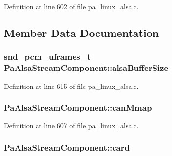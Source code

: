 Definition at line 602 of file pa\+\_\+linux\+\_\+alsa.\+c.



\subsection{Member Data Documentation}
\subsubsection[{\texorpdfstring{alsa\+Buffer\+Size}{alsaBufferSize}}]{\setlength{\rightskip}{0pt plus 5cm}snd\+\_\+pcm\+\_\+uframes\+\_\+t Pa\+Alsa\+Stream\+Component\+::alsa\+Buffer\+Size}\hypertarget{struct_pa_alsa_stream_component_a0334d25b231900ea7d291dd7b7149dbb}{}\label{struct_pa_alsa_stream_component_a0334d25b231900ea7d291dd7b7149dbb}


Definition at line 615 of file pa\+\_\+linux\+\_\+alsa.\+c.

\subsubsection[{\texorpdfstring{can\+Mmap}{canMmap}}]{ Pa\+Alsa\+Stream\+Component\+::can\+Mmap}\hypertarget{struct_pa_alsa_stream_component_a95ddfb65dc825b91524f7d6b5f0fe004}{}\label{struct_pa_alsa_stream_component_a95ddfb65dc825b91524f7d6b5f0fe004}


Definition at line 607 of file pa\+\_\+linux\+\_\+alsa.\+c.

\subsubsection[{\texorpdfstring{card}{card}}]{ Pa\+Alsa\+Stream\+Component\+::card}\hypertarget{struct_pa_alsa_stream_component_aaa548d6dfb327ddcc6f1b2b5d9a9be18}{}\label{struct_pa_alsa_stream_component_aaa548d6dfb327ddcc6f1b2b5d9a9be18}


